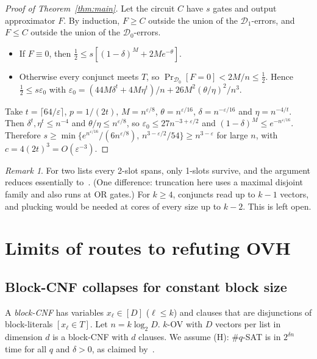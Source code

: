 \documentclass[11pt,a4paper]{article}
\theoremstyle{plain}
\theoremstyle{definition}
\theoremstyle{remark}
\newtheorem*{remark}{Remark}
\newcommand{\Dz}{\mathcal{D}_0}
\newcommand{\Do}{\mathcal{D}_1}
\begin{document}
\begin{proof}[Proof of Theorem~\ref{thm:main}]
Let the circuit $C$ have $s$ gates and output approximator $F$. By induction, $F\ge C$ outside the union of the
$\Do$-errors, and $F\le C$ outside the union of the $\Dz$-errors.
\begin{itemize}
  \item If $F\equiv0$, then $\frac12\le s[(1-\delta)^M+2Me^{-\theta}]$.
  \item Otherwise every conjunct meets $T$, so $\Pr_{\Dz}[F=0]<2M/n\le\frac12$. Hence $\frac12\le s\varepsilon_0$
    with $\varepsilon_0=(44M\delta^t+4M\eta^t)/n+26M^2(\theta/\eta)^2/n^3$.
\end{itemize}
Take $t=\lceil64/\varepsilon\rceil$, $p=1/(2t)$, $M=n^{\varepsilon/8}$, $\theta=n^{\varepsilon/16}$,
$\delta=n^{-\varepsilon/16}$ and $\eta=n^{-4/t}$. Then $\delta^t,\eta^t\le n^{-4}$ and $\theta/\eta\le n^{\varepsilon/8}$,
so $\varepsilon_0\le27n^{-3+\varepsilon/2}$ and $(1-\delta)^M\le e^{-n^{\varepsilon/16}}$. Therefore
$s\ge\min\{e^{n^{\varepsilon/16}}/(6n^{\varepsilon/8}),\,n^{3-\varepsilon/2}/54\}\ge n^{3-\varepsilon}$ for large $n$,
with $c=4(2t)^3=O(\varepsilon^{-3})$.
\end{proof}

\begin{remark}
For two lists every 2-slot spans, only 1-slots survive, and the argument reduces essentially to~\cite{CLSS26}. (One
difference: truncation here uses a maximal disjoint family and also runs at OR gates.) For $k\ge4$, conjuncts read up
to $k-1$ vectors, and plucking would be needed at cores of every size up to $k-2$. This is left open.
\end{remark}

\section{Limits of routes to refuting OVH}\label{sec:trackA}

\subsection{Block-CNF collapses for constant block size}
A \emph{block-CNF} has variables $x_\ell\in[D]$ ($\ell\le k$) and clauses that are disjunctions of block-literals
$[x_\ell\in T]$. Let $n=k\log_2D$. $k$-OV with $D$ vectors per list in dimension $d$ is a block-CNF with $d$ clauses.
We assume (H): \#$q$-SAT is in $2^{\delta n}$ time for all $q$ and $\delta>0$, as claimed by~\cite{OpenAI26,Anthropic26}.
\end{document}
